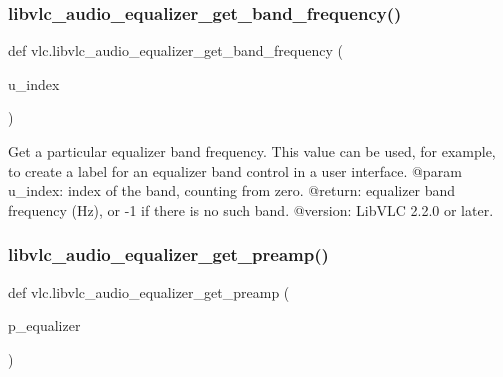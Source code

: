 \subsubsection{\texorpdfstring{libvlc\+\_\+audio\+\_\+equalizer\+\_\+get\+\_\+band\+\_\+frequency()}{libvlc\_audio\_equalizer\_get\_band\_frequency()}}
{\footnotesize\ttfamily def vlc.\+libvlc\+\_\+audio\+\_\+equalizer\+\_\+get\+\_\+band\+\_\+frequency (\begin{DoxyParamCaption}\item[{}]{u\+\_\+index }\end{DoxyParamCaption})}

\begin{DoxyVerb}Get a particular equalizer band frequency.
This value can be used, for example, to create a label for an equalizer band control
in a user interface.
@param u_index: index of the band, counting from zero.
@return: equalizer band frequency (Hz), or -1 if there is no such band.
@version: LibVLC 2.2.0 or later.
\end{DoxyVerb}
 \mbox{\label{namespacevlc_a0f558cf51d137d01323634077b0f4b4e}} 
\subsubsection{\texorpdfstring{libvlc\+\_\+audio\+\_\+equalizer\+\_\+get\+\_\+preamp()}{libvlc\_audio\_equalizer\_get\_preamp()}}
{\footnotesize\ttfamily def vlc.\+libvlc\+\_\+audio\+\_\+equalizer\+\_\+get\+\_\+preamp (\begin{DoxyParamCaption}\item[{}]{p\+\_\+equalizer }\end{DoxyParamCaption})}

